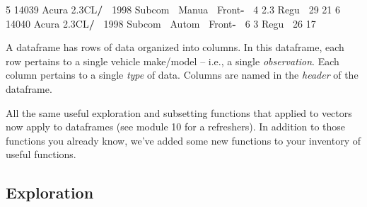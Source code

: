 \documentclass[
]{book}
\newenvironment{Shaded}{\begin{snugshade}}{\end{snugshade}}
\newcommand{\DecValTok}[1]{\textcolor[rgb]{0.00,0.00,0.81}{#1}}
\newcommand{\ErrorTok}[1]{\textcolor[rgb]{0.64,0.00,0.00}{\textbf{#1}}}
\newcommand{\FloatTok}[1]{\textcolor[rgb]{0.00,0.00,0.81}{#1}}
\newcommand{\NormalTok}[1]{#1}
\newcommand{\OperatorTok}[1]{\textcolor[rgb]{0.81,0.36,0.00}{\textbf{#1}}}
\newcommand{\StringTok}[1]{\textcolor[rgb]{0.31,0.60,0.02}{#1}}
\begin{document}
\begin{Shaded}
\begin{Highlighting}[]
\DecValTok{5} \DecValTok{14039}\NormalTok{ Acura }\FloatTok{2.3}\NormalTok{CL}\OperatorTok{/}\ErrorTok{~}\StringTok{  }\DecValTok{1998}\NormalTok{ Subcom}\OperatorTok{~}\StringTok{ }\NormalTok{Manua}\OperatorTok{~}\StringTok{ }\NormalTok{Front}\OperatorTok{-}\ErrorTok{~}\StringTok{     }\DecValTok{4}   \FloatTok{2.3}\NormalTok{ Regu}\OperatorTok{~}\StringTok{    }\DecValTok{29}    \DecValTok{21}
\DecValTok{6} \DecValTok{14040}\NormalTok{ Acura }\FloatTok{2.3}\NormalTok{CL}\OperatorTok{/}\ErrorTok{~}\StringTok{  }\DecValTok{1998}\NormalTok{ Subcom}\OperatorTok{~}\StringTok{ }\NormalTok{Autom}\OperatorTok{~}\StringTok{ }\NormalTok{Front}\OperatorTok{-}\ErrorTok{~}\StringTok{     }\DecValTok{6}   \DecValTok{3}\NormalTok{   Regu}\OperatorTok{~}\StringTok{    }\DecValTok{26}    \DecValTok{17}
\end{Highlighting}
\end{Shaded}

A dataframe has rows of data organized into columns. In this dataframe, each row pertains to a single vehicle make/model -- i.e., a single \emph{observation}. Each column pertains to a single \emph{type} of data. Columns are named in the \emph{header} of the dataframe.

All the same useful exploration and subsetting functions that applied to vectors now apply to dataframes (see module 10 for a refreshers). In addition to those functions you already know, we've added some new functions to your inventory of useful functions.

\hypertarget{exploration}{%
\subsection*{Exploration}\label{exploration}}
\end{document}
